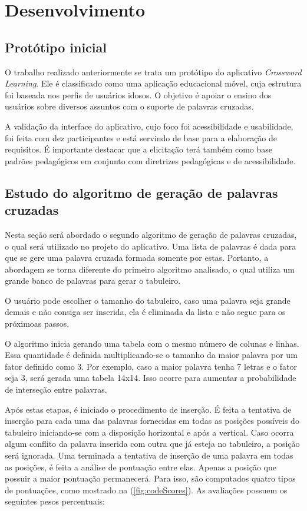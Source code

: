 \section{Desenvolvimento}

\subsection{Protótipo inicial}
O trabalho realizado anteriormente \citep{oliveira2018crossword} se trata um protótipo do aplicativo \textit{Crossword Learning}. Ele é classificado como uma aplicação educacional móvel, cuja estrutura foi baseada nos perfis de usuários idosos. O objetivo é apoiar o ensino dos usuários sobre diversos assuntos com o suporte de palavras cruzadas.

A validação da interface do aplicativo, cujo foco foi acessibilidade e usabilidade, foi feita com dez participantes e está servindo de base para a elaboração de requisitos. É importante destacar que a elicitação terá também como base padrões pedagógicos em conjunto com diretrizes pedagógicas e de acessibilidade.

\subsection{Estudo do algoritmo de geração de palavras cruzadas}
Nesta seção será abordado o segundo algoritmo de geração de palavras cruzadas, o qual será utilizado no projeto do aplicativo. Uma lista de palavras é dada para que se gere uma palavra cruzada formada somente por estas. Portanto, a abordagem se torna diferente do primeiro algoritmo analisado, o qual utiliza um grande banco de palavras para gerar o tabuleiro.

O usuário pode escolher o tamanho do tabuleiro, caso uma palavra seja grande demais e não consiga ser inserida, ela é eliminada da lista e não segue para os próximoas passos.

O algoritmo inicia gerando uma tabela com o mesmo número de colunas e linhas. Essa quantidade é definida multiplicando-se o tamanho da maior palavra por um fator definido como 3. Por exemplo, caso a maior palavra tenha 7 letras e o fator seja 3, será gerada uma tabela 14x14. Isso ocorre para aumentar a probabilidade de interseção entre palavras. 

Após estas etapas, é iniciado o procedimento de inserção. É feita a tentativa de inserção para cada uma das palavras fornecidas em todas as posições possíveis do tabuleiro iniciando-se com a disposição horizontal e após a vertical. Caso ocorra algum conflito da palavra inserida com outra que já esteja no tabuleiro, a posição será ignorada. Uma terminada a tentativa de inserção de uma palavra em todas as posições, é feita a análise de pontuação entre elas. Apenas a posição que possuir a maior pontuação permanecerá. Para isso, são computados quatro tipos de pontuações, como mostrado na (\autoref{fig:codeScores}). As avaliações possuem os seguintes pesos percentuais:

